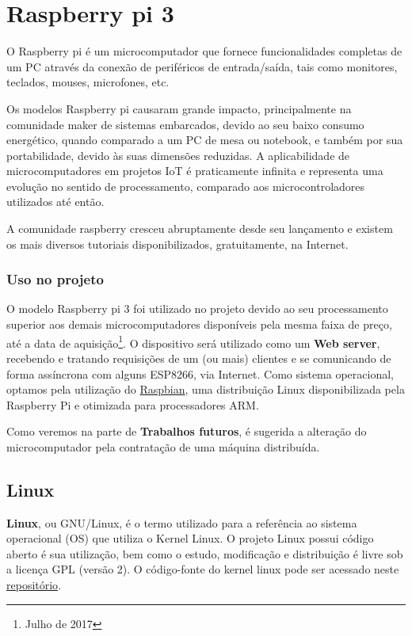 \documentclass[
12pt,				%
openany,			%
twoside,			%
a4paper,			%
english,			%
french,				%
spanish,			%
brazil,				%
]{abntex2}
\begin{document}
\chapter{Raspberry pi 3}
O Raspberry pi é um microcomputador que fornece funcionalidades completas de um PC através da conexão de periféricos de entrada/saída, tais como monitores, teclados, mouses, microfones, etc.

Os modelos Raspberry pi causaram grande impacto, principalmente na comunidade  maker de sistemas embarcados, devido ao seu baixo consumo energético, quando comparado a um PC de mesa ou notebook, e também por sua portabilidade, devido às suas dimensões reduzidas. A aplicabilidade de microcomputadores em projetos IoT é praticamente infinita e representa uma evolução no sentido de processamento, comparado aos microcontroladores utilizados até então.

A comunidade raspberry cresceu abruptamente desde seu lançamento e existem os mais diversos tutoriais disponibilizados, gratuitamente, na Internet. 

\subsection{Uso no projeto}
O modelo Raspberry pi 3 foi utilizado no projeto devido ao seu processamento superior aos demais microcomputadores disponíveis pela mesma faixa de preço, até a data de aquisição\footnote{Julho de 2017}. O dispositivo será utilizado como um \textbf{Web server}, recebendo e tratando requisições de um (ou mais) clientes e se comunicando de forma assíncrona com alguns ESP8266, via Internet. Como sistema operacional, optamos pela utilização do \href{https://www.raspberrypi.org/downloads/raspbian/}{Raspbian}, uma distribuição Linux disponibilizada pela Raspberry Pi e otimizada para processadores ARM.

Como veremos na parte de \textbf{Trabalhos futuros}, é sugerida a alteração do microcomputador pela contratação de uma máquina distribuída.

\section{Linux}
\textbf{Linux}, ou GNU/Linux, é o termo utilizado para a referência ao sistema operacional (OS) que utiliza o Kernel Linux. O projeto Linux possui código aberto é sua utilização, bem como o estudo, modificação e distribuição é livre sob a licença GPL (versão 2). O código-fonte do kernel linux pode ser acessado neste \href{https://github.com/torvalds/linux}{repositório}.
\end{document}
